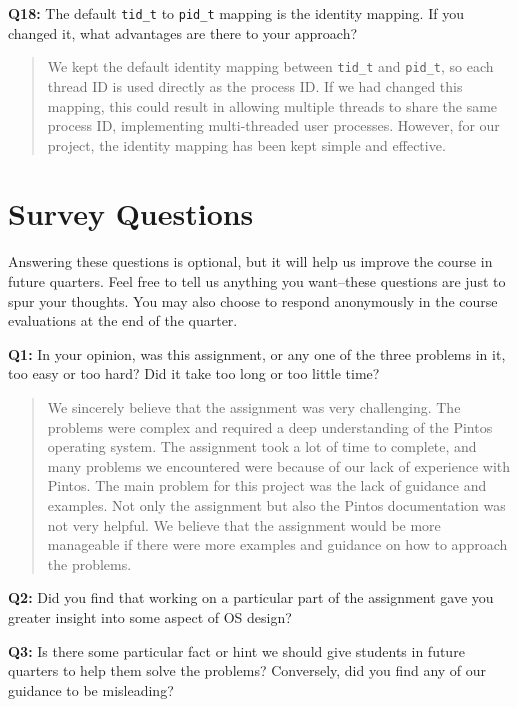 \documentclass[a4paper,11pt]{paper}
\begin{document}
\textbf{Q18:} The default \texttt{tid\_t} to \texttt{pid\_t} mapping is the identity mapping. If you changed it, what advantages are there to your approach?
\begin{quote}
We kept the default identity mapping between \texttt{tid\_t} and \texttt{pid\_t}, so each thread ID is used directly as the process ID. If we had changed this mapping, this could result in allowing multiple threads to share the same process ID, implementing multi-threaded user processes. However, for our project, the identity mapping has been kept simple and effective.
\end{quote}

\newpage
\section{Survey Questions}

Answering these questions is optional, but it will help us improve the course in future quarters.  Feel free to tell us anything you want--these questions are just to spur your thoughts.  You may also choose to respond anonymously in the course evaluations at the end of the quarter.

\textbf{Q1:} In your opinion, was this assignment, or any one of the three problems in it, too easy or too hard?  Did it take too long or too little time?
\begin{quote}
    We sincerely believe that the assignment was very challenging. The problems were
	complex and required a deep understanding of the Pintos operating system. The
	assignment took a lot of time to complete, and many problems we encountered
	were because of our lack of experience with Pintos. The main problem for this
	project was the lack of guidance and examples. Not only the assignment but also
	the Pintos documentation was not very helpful. We believe that the assignment
	would be more manageable if there were more examples and guidance on how to
	approach the problems.
\end{quote}

\textbf{Q2:} Did you find that working on a particular part of the assignment gave you greater insight into some aspect of OS design?
\begin{quote}

\end{quote}

\textbf{Q3:} Is there some particular fact or hint we should give students in future quarters to help them solve the problems?  Conversely, did you find any of our guidance to be misleading?
\begin{quote}
\end{quote}
\end{document}

